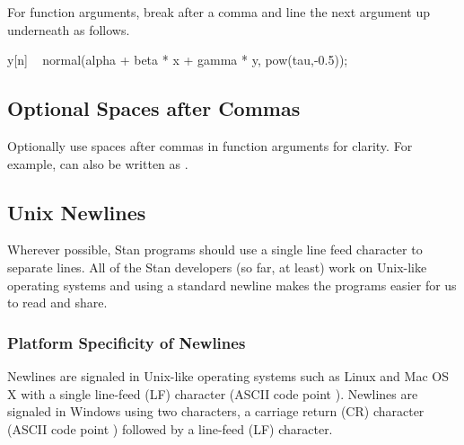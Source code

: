 For function arguments, break after a comma and line the next
argument up underneath as follows.
%
\begin{stancode}
y[n] ~ normal(alpha + beta * x + gamma * y,
              pow(tau,-0.5));
\end{stancode}
%

\subsection{Optional Spaces after Commas}

Optionally use spaces after commas in function arguments for clarity.
For example,  can also be
written as .



\subsection{Unix Newlines}

Wherever possible, Stan programs should use a single line feed
character to separate lines.  All of the Stan developers (so far, at
least) work on Unix-like operating systems and using a standard
newline makes the programs easier for us to read and share.

\subsubsection{Platform Specificity of Newlines}

Newlines are signaled in Unix-like operating systems such as Linux and
Mac OS X with a single line-feed (LF) character (ASCII code point
).  Newlines are signaled in Windows using two characters,
a carriage return (CR) character (ASCII code point )
followed by a line-feed (LF) character.
